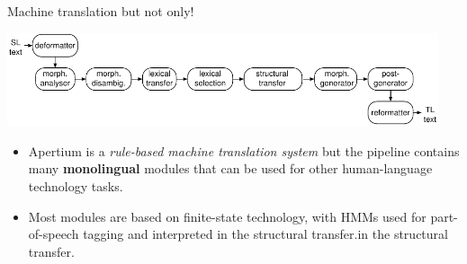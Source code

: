 \documentclass[final]{beamer} %
\newlength{\wideitemsep}
\let\olditem\item
\renewcommand{\item}{\setlength{\itemsep}{\wideitemsep}\olditem}
\begin{document}
\begin{frame}
\begin{columns}
\begin{column}{1\textwidth}
\begin{block}{Machine translation but not only!}
\begin{center}
\includegraphics[width=0.95\textwidth]{Images/architecture.pdf}
\end{center}
\begin{itemize}
\item Apertium is a \emph{rule-based machine translation system} but the pipeline contains many \textbf{monolingual} modules that can be used for other human-language technology tasks.
\item Most modules are based on finite-state technology, with HMMs used for part-of-speech tagging and interpreted in the structural transfer.in the structural transfer.
\end{itemize}




\end{block}
\end{column}
\end{columns}
\end{frame}
\end{document}
